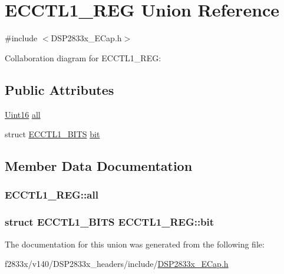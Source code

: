 \hypertarget{union_e_c_c_t_l1___r_e_g}{}\section{E\+C\+C\+T\+L1\+\_\+\+R\+E\+G Union Reference}
\label{union_e_c_c_t_l1___r_e_g}


{\ttfamily \#include $<$D\+S\+P2833x\+\_\+\+E\+Cap.\+h$>$}



Collaboration diagram for E\+C\+C\+T\+L1\+\_\+\+R\+E\+G\+:
\subsection*{Public Attributes}
\begin{DoxyCompactItemize}
\item 
\hyperlink{_d_s_p2833x___device_8h_a59a9f6be4562c327cbfb4f7e8e18f08b}{Uint16} \hyperlink{union_e_c_c_t_l1___r_e_g_a075e068fb5842891beda01182b652e0c}{all}
\item 
struct \hyperlink{struct_e_c_c_t_l1___b_i_t_s}{E\+C\+C\+T\+L1\+\_\+\+B\+I\+T\+S} \hyperlink{union_e_c_c_t_l1___r_e_g_ad17fd4d0830d024d2f29abcadf651806}{bit}
\end{DoxyCompactItemize}


\subsection{Member Data Documentation}
\hypertarget{union_e_c_c_t_l1___r_e_g_a075e068fb5842891beda01182b652e0c}{}
\subsubsection[{all}]{ E\+C\+C\+T\+L1\+\_\+\+R\+E\+G\+::all}\label{union_e_c_c_t_l1___r_e_g_a075e068fb5842891beda01182b652e0c}
\hypertarget{union_e_c_c_t_l1___r_e_g_ad17fd4d0830d024d2f29abcadf651806}{}
\subsubsection[{bit}]{\setlength{\rightskip}{0pt plus 5cm}struct {\bf E\+C\+C\+T\+L1\+\_\+\+B\+I\+T\+S} E\+C\+C\+T\+L1\+\_\+\+R\+E\+G\+::bit}\label{union_e_c_c_t_l1___r_e_g_ad17fd4d0830d024d2f29abcadf651806}


The documentation for this union was generated from the following file\+:\begin{DoxyCompactItemize}
\item 
f2833x/v140/\+D\+S\+P2833x\+\_\+headers/include/\hyperlink{_d_s_p2833x___e_cap_8h}{D\+S\+P2833x\+\_\+\+E\+Cap.\+h}\end{DoxyCompactItemize}
